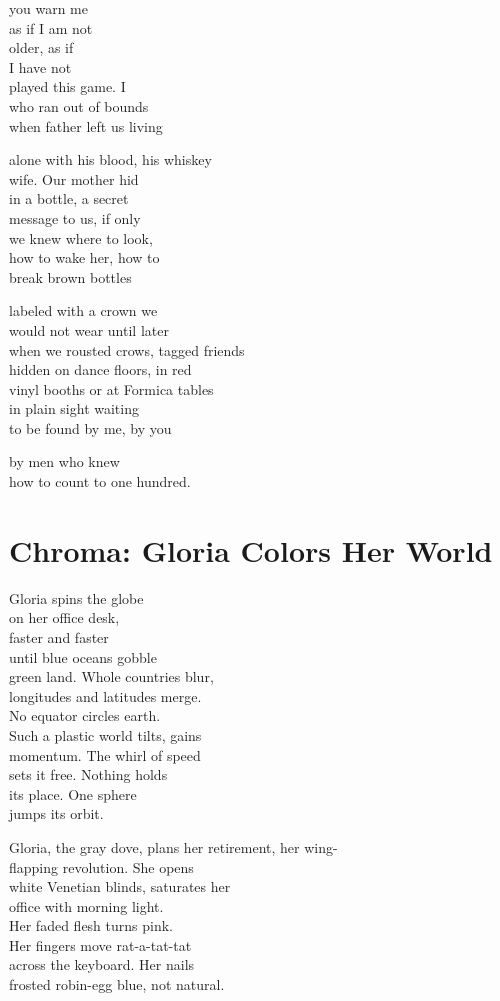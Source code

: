 \documentclass[twoside,10pt]{book}
\begin{document}
you warn me\\
as if I am not\\
older, as if\\
I have not\\
played this game. I\\
who ran out of bounds\\
when father left us living

alone with his blood, his whiskey\\
wife. Our mother hid\\
in a bottle, a secret\\
message to us, if only\\
we knew where to look,\\
how to wake her, how to\\
break brown bottles

labeled with a crown we\\
would not wear until later\\
when we rousted crows, tagged friends\\
hidden on dance floors, in red\\
vinyl booths or at Formica tables\\
in plain sight waiting\\
to be found by me, by you

by men who knew\\
how to count to one hundred.


\clearpage
\section{Chroma: Gloria Colors Her World}

Gloria spins the globe\\
on her office desk,\\
faster and faster\\
until blue oceans gobble\\
green land. Whole countries blur,\\
longitudes and latitudes merge.\\
No equator circles earth.\\
Such a plastic world tilts, gains\\
momentum. The whirl of speed\\
sets it free. Nothing holds\\
its place. One sphere\\
jumps its orbit.

Gloria, the gray dove, plans her retirement, her wing-\\
flapping revolution. She opens\\
white Venetian blinds, saturates her\\
office with morning light.\\
Her faded flesh turns pink.\\
Her fingers move rat-a-tat-tat\\
across the keyboard. Her nails\\
frosted robin-egg blue, not natural.
\end{document}
